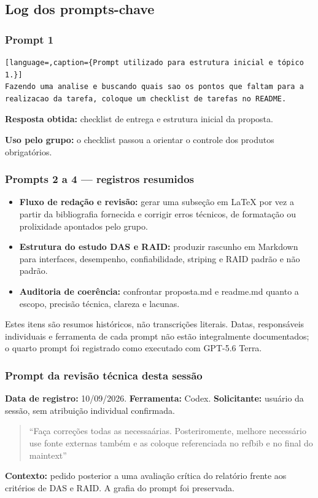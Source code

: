 \documentclass[titlepage]{article}
\begin{document}
\subsection{Log dos prompts-chave}

\subsubsection{Prompt 1}
\begin{lstlisting}[language=,caption={Prompt utilizado para estrutura inicial e tópico 1.}]
Fazendo uma analise e buscando quais sao os pontos que faltam para a
realizacao da tarefa, coloque um checklist de tarefas no README.
\end{lstlisting}

\noindent\textbf{Resposta obtida:} checklist de entrega e estrutura inicial da proposta.

\medskip
\noindent\textbf{Uso pelo grupo:} o checklist passou a orientar o controle dos produtos obrigatórios.

\subsubsection{Prompts 2 a 4 — registros resumidos}
\begin{itemize}
    \item \textbf{Fluxo de redação e revisão:} gerar uma subseção em \LaTeX{} por vez a partir da bibliografia fornecida e corrigir erros técnicos, de formatação ou prolixidade apontados pelo grupo.
    \item \textbf{Estrutura do estudo DAS e RAID:} produzir rascunho em Markdown para interfaces, desempenho, confiabilidade, striping e RAID padrão e não padrão.
    \item \textbf{Auditoria de coerência:} confrontar proposta.md e readme.md quanto a escopo, precisão técnica, clareza e lacunas.
\end{itemize}
\noindent Estes itens são resumos históricos, não transcrições literais. Datas, responsáveis individuais e ferramenta de cada prompt não estão integralmente documentados; o quarto prompt foi registrado como executado com GPT-5.6 Terra.


\subsubsection{Prompt da revisão técnica desta sessão}
\noindent\textbf{Data de registro:} 10/09/2026. \textbf{Ferramenta:} Codex. \textbf{Solicitante:} usuário da sessão, sem atribuição individual confirmada.
\begin{quote}\small
``Faça correções todas as necessaárias. Posteriromente, melhore necessário use fonte externas também e as coloque referenciada no refbib e no final do maintext''
\end{quote}
\noindent\textbf{Contexto:} pedido posterior a uma avaliação crítica do relatório frente aos critérios de DAS e RAID. A grafia do prompt foi preservada.
\end{document}
